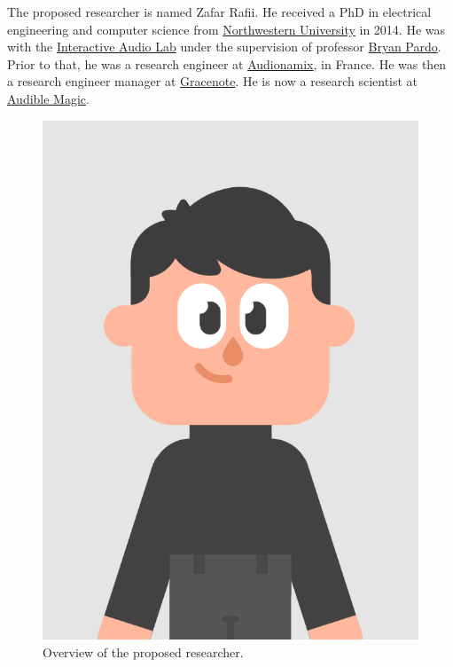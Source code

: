 \documentclass{article}
\begin{document}
\nocite{inbook_pardo_2018}
\nocite{inbook_rafii_2014}

\nocite{report_rafii_2009}

\nocite{misc_mcdermott_oct2012}

\nocite{misc_rafii_jun2014}
\nocite{misc_rafii_jun2011}
\nocite{misc_rafii_dec2007}

\nocite{misc_rafii_mar2021}
\nocite{misc_rafii_apr2018}
\nocite{misc_rafii_july2015}
\nocite{misc_rafii_may2015}
\nocite{misc_rafii_jul2011}

\nocite{misc_rafii_dec2014_4}
\nocite{misc_rafii_dec2014_3}
\nocite{misc_rafii_dec2014_2}
\nocite{misc_rafii_dec2014}

\nocite{online_rafii_2019}
\nocite{online_rafii_2017}


The proposed researcher is named Zafar Rafii. He received a PhD in electrical engineering and computer science from \href{https://www.northwestern.edu/}{Northwestern University} in 2014. He was with the \href{https://interactiveaudiolab.github.io/}{Interactive Audio Lab} under the supervision of professor \href{https://bryan-pardo.github.io/}{Bryan Pardo}. Prior to that, he was a research engineer at \href{https://audionamix.com/}{Audionamix}, in France. He was then a research engineer manager at \href{https://www.gracenote.com/}{Gracenote}. He is now a research scientist at \href{https://www.audiblemagic.com/}{Audible Magic}.

\begin{figure}[!htb]
\centering
\includegraphics[width=0.5\columnwidth]{Images/duolingo.png}
\caption{Overview of the proposed researcher.}
\label{fig:zafar}
\end{figure}
\end{document}
